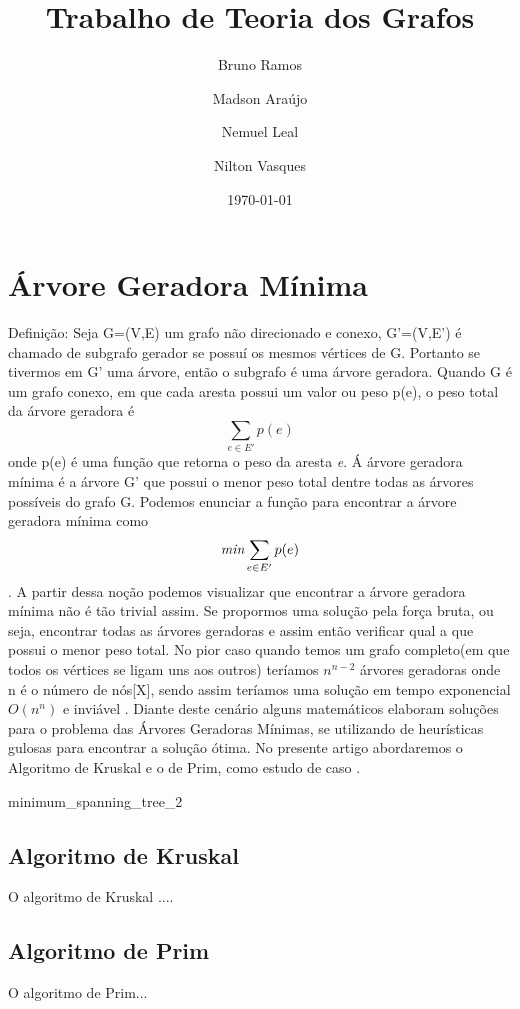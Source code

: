\documentclass[a4paper,12pt]{article}
\begin{document}
\title{Trabalho de Teoria dos Grafos}
\author{Bruno Ramos \and Madson Araújo \and Nemuel Leal \and Nilton Vasques}
\date{\today}
\maketitle

\section{Árvore Geradora Mínima}
Definição: Seja G=(V,E) um grafo não direcionado e conexo, G'=(V,E') é chamado de subgrafo gerador se possuí os mesmos vértices de G. Portanto se tivermos em G' uma árvore, então o subgrafo é uma árvore geradora. 
Quando G é um grafo conexo, em que cada aresta possui um valor ou peso p(e), o peso total da árvore geradora é \[\sum_{e \in E'}p(e)\] onde p(e) é uma função que retorna o peso da aresta \emph{e}. Á árvore geradora mínima é a árvore G' que possui o menor peso total dentre todas as árvores possíveis do grafo G\cite{nogueira}. Podemos enunciar a função para encontrar a árvore geradora mínima como \[\emph{min}\sum_{e\in E'}p(e)\].
A partir dessa noção podemos visualizar que encontrar a árvore geradora mínima não é tão trivial assim. Se propormos uma solução pela força bruta, ou seja, encontrar todas as árvores geradoras e assim então verificar qual a que possui o menor peso total. No pior caso quando temos um grafo completo(em que todos os vértices se ligam uns aos outros) teríamos $n^{n-2}$ árvores geradoras onde n é o número de nós[X], sendo assim teríamos uma solução em tempo exponencial $O(n^n)$ e inviável \nocite{*}.
Diante deste cenário alguns matemáticos elaboram soluções para o problema das Árvores Geradoras Mínimas, se utilizando de heurísticas gulosas para encontrar a solução ótima. No presente artigo abordaremos o Algoritmo de Kruskal e o de Prim, como estudo de caso .

{minimum_spanning_tree_2}

\subsection{Algoritmo de Kruskal}
O algoritmo de Kruskal ....

\subsection{Algoritmo de Prim}
O algoritmo de Prim...
	


\end{document}
